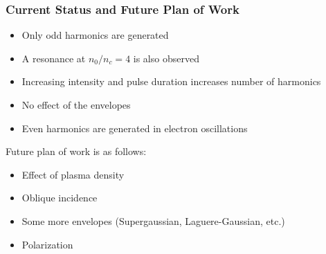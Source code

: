 \documentclass{beamer}
\begin{document}
\begin{frame}
    \frametitle{Current Status and Future Plan of Work}
    \begin{itemize}
        \item Only odd harmonics are generated
        \item A resonance at $n_0/n_c=4$ is also observed
        \item Increasing intensity and pulse duration increases number of harmonics
        \item No effect of the envelopes
        \item Even harmonics are generated in electron oscillations
    \end{itemize}
    Future plan of work is as follows:
    \begin{itemize}
        \item Effect of plasma density
        \item Oblique incidence
        \item Some more envelopes (Supergaussian, Laguere-Gaussian, etc.)
        \item Polarization
    \end{itemize}
\end{frame}

\end{document}
